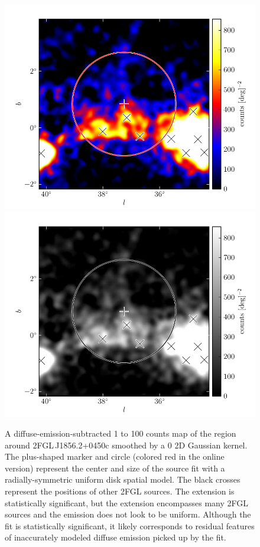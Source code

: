 \begin{figure}[htbp]
    \ifcolorfigure
    \includegraphics{source_plots/example_bad_fit_color.pdf}
    \else
    \includegraphics{source_plots/example_bad_fit_bw.pdf}
    \fi
    \caption{
    A diffuse-emission-subtracted 1 \gev to 100 \gev counts map of the
    region around 2FGL\,J1856.2+0450c smoothed by a 0 2D Gaussian
    kernel. The plus-shaped marker and circle (colored red in
    the online version) represent the center and size of the source
    fit with a
    radially-symmetric uniform disk spatial model.  The black
    crosses represent the positions of other 2FGL sources.  The extension
    is statistically significant, but the extension encompasses many 2FGL
    sources and the emission does not look to be uniform. Although
    the fit is statistically significant, it likely corresponds to
    residual features of inaccurately modeled diffuse emission picked
    up by the fit. 
    }
\end{figure}



